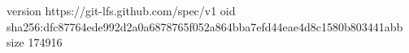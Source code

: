 version https://git-lfs.github.com/spec/v1
oid sha256:dfc87764ede992d2a0a6878765f052a864bba7efd44eae4d8c1580b803441abb
size 174916
